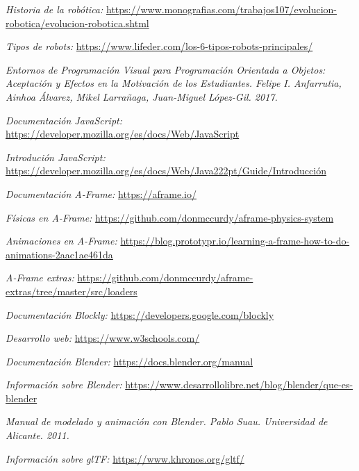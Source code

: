 \begin{thebibliography}{99}

    \textit{Historia de la robótica:}   \url{https://www.monografias.com/trabajos107/evolucion-robotica/evolucion-robotica.shtml}
    
    \textit{Tipos de robots:}   \url{https://www.lifeder.com/los-6-tipos-robots-principales/}
    
    \textit{Entornos de Programación Visual para Programación Orientada a Objetos: Aceptación y Efectos en la Motivación de los Estudiantes. Felipe I. Anfarrutia, Ainhoa Álvarez, Mikel Larrañaga, Juan-Miguel López-Gil. 2017.}
    
    \textit{Documentación JavaScript: }
    \url{https://developer.mozilla.org/es/docs/Web/JavaScript}
    
    
    \textit{Introdución JavaScript: }
    \url{https://developer.mozilla.org/es/docs/Web/Java222pt/Guide/Introducción}
   
    \textit{Documentación A-Frame:}
    \url{https://aframe.io/}
    
    \textit{Físicas en A-Frame: }
    \url{https://github.com/donmccurdy/aframe-physics-system}
    
    \textit{Animaciones en A-Frame: }
    \url{https://blog.prototypr.io/learning-a-frame-how-to-do-animations-2aac1ae461da}
    
    \textit{A-Frame extras: }
    \url{https://github.com/donmccurdy/aframe-extras/tree/master/src/loaders}
    
    \textit{Documentación Blockly: }
    \url{https://developers.google.com/blockly}
    
    \textit{Desarrollo web: }
    \url{https://www.w3schools.com/}
    
    \textit{Documentación Blender: }
    \url{https://docs.blender.org/manual}
    
    \textit{Información sobre Blender: }
    \url{https://www.desarrollolibre.net/blog/blender/que-es-blender}
    
    \textit{Manual de modelado y animación con Blender. Pablo Suau. Universidad de Alicante. 2011.}
    
    \textit{Información sobre glTF: }
    \url{https://www.khronos.org/gltf/}

\end{thebibliography}